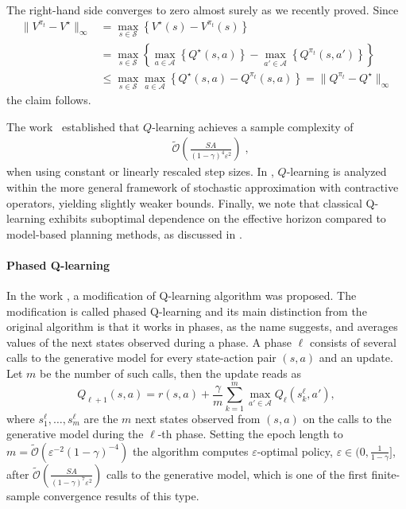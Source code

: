 \documentclass{article}
\numberwithin{equation}{section}
\newcommand{\norm}[1]{\|#1\|}
\newcommand{\cA}{\mathcal{A}}
\newcommand{\eqsp}{\;}
\begin{document}
The right-hand side converges to zero almost surely as we recently proved. Since
\begin{align*}
    \norm{V^{\pi_t} - V^\star}_{\infty} &= \max\limits_{s\in\mathcal{S}}\left\{V^{\star}(s) - V^{\pi_t}(s)\right\}
    \\
    &= \max\limits_{s\in\mathcal{S}}\left\{\max\limits_{a\in\mathcal{A}}\left\{Q^\star(s, a)\right\} - \max\limits_{a'\in\mathcal{A}}\left\{Q^{\pi_t}(s, a')\right\}\right\}
    \\
    &\leq\max\limits_{s\in\mathcal{S}}\max\limits_{a\in\mathcal{A}}\left\{Q^\star(s, a) - Q^{\pi_t}(s, a)\right\} = \norm{Q^{\pi_t} - Q^\star}_{\infty}
\end{align*}
the claim follows.

{The work}~\cite{li2024q} established that $Q$-learning achieves a sample complexity of 
\begin{equation}\label{eq:q_learning_sample_complexity_generative_model}
    \begin{aligned}
        &\widetilde{\mathcal{O}}\left(\frac{SA}{(1-\gamma)^4 \varepsilon^2}\right)\eqsp,
    \end{aligned}
\end{equation}
when using constant or linearly rescaled step sizes.
In \cite{wainwright2019stochastic}, $Q$-learning is analyzed within the more general framework of stochastic approximation with contractive operators, yielding slightly weaker bounds.
Finally, we note that classical Q-learning exhibits suboptimal dependence on the effective horizon compared to model-based planning methods, as discussed in \cite{li2024q}.

\paragraph{Phased Q-learning}
In the work \cite{kearns1998finite}, a modification of Q-learning algorithm was proposed. The modification is called phased Q-learning and its main distinction from the original algorithm is that it works in phases, as the name suggests, and averages values of the next states observed during a phase. A phase $\ell$ consists of several calls to the generative model for every state-action pair $(s,a)$ and an update. Let $m$ be the number of such calls, then the update reads as
$$
{Q}_{\ell+1}(s, a)=r(s,a)+ \frac{\gamma}{m} \sum_{k=1}^{m} \max_{a'\in\cA}Q_{\ell}(s_k^\ell,a'),
$$
where $s_1^{\ell}, \ldots, s_{m}^{\ell}$ are the $m$ next states observed from $(s, a)$ on the calls to the generative model during the $\ell$-th phase. Setting the epoch length to \(m = \widetilde{\mathcal{O}}(\varepsilon^{-2}(1-\gamma)^{-4})\) the algorithm computes $\varepsilon$-optimal policy, $\varepsilon \in \bigl(0, \frac{1}{1-\gamma}\bigr]$, after $\widetilde{\mathcal{O}}\left(\frac{S A}{(1-\gamma)^7\varepsilon^2}\right)$ calls to the generative model,  which is one of the first finite-sample convergence results of this type. 
\end{document}
